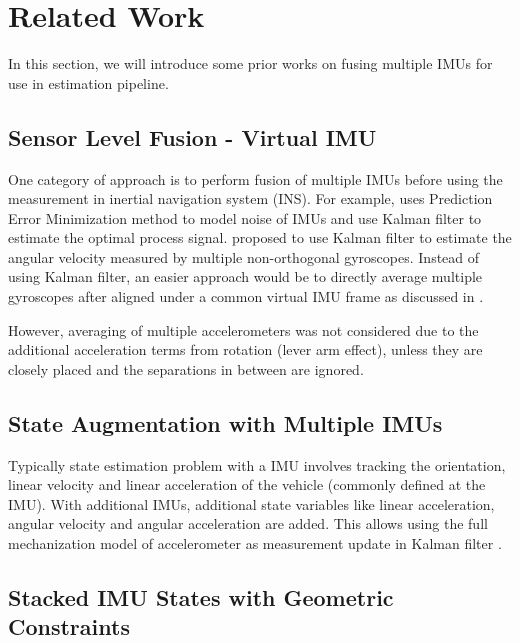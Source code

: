 \documentclass[conference]{IEEEtran}
\begin{document}
\section{Related Work}

In this section, we will introduce some prior works on fusing multiple IMUs for use in estimation pipeline.


\subsection{Sensor Level Fusion - Virtual IMU}\label{VIMU}

One category of approach is to perform fusion of multiple IMUs before using the measurement in inertial navigation system (INS). For example, \cite{jafari2014_PEM} uses Prediction Error Minimization method to model noise of IMUs and use Kalman filter to estimate the optimal process signal. \cite{xue2023} proposed to use Kalman filter to estimate the angular velocity measured by multiple non-orthogonal gyroscopes. Instead of using Kalman filter, an easier approach would be to directly average multiple gyroscopes after aligned under a common virtual IMU frame as discussed in \cite{waegli2008, patel2022_multi-imu, Colomina2004REDUNDANTIF}.

However, averaging of multiple accelerometers was not considered due to the additional acceleration terms from rotation (lever arm effect), unless they are closely placed and the separations in between are ignored.

\subsection{State Augmentation with Multiple IMUs}\label{augmented}

Typically state estimation problem with a IMU involves tracking the orientation, linear velocity and linear acceleration of the vehicle (commonly defined at the IMU). With additional IMUs, additional state variables like linear acceleration, angular velocity and angular acceleration are added. This allows using the full mechanization model of accelerometer as measurement update in Kalman filter \cite{Bancroft2011DataFA, Beaudoin2018_satelite}.

\subsection{Stacked IMU States with Geometric Constraints}\label{constraint}
\end{document}
